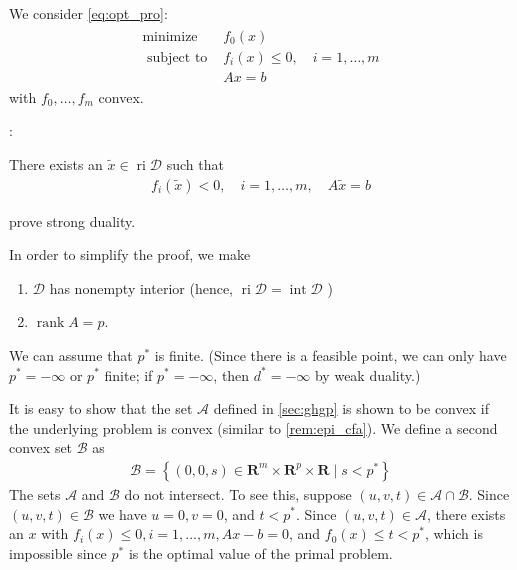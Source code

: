 \documentclass{article}
\newcommand{\ri}{\operatorname{ri}}
\newcommand{\inte}{\operatorname{int}}
\begin{document}

We consider \cref{eq:opt_pro}:
\begin{align}
\begin{array}{ll}
\operatorname{minimize} & f_{0}(x) \\
\text { subject to } & f_{i}(x) \leq 0, \quad i=1, \ldots, m \\
& A x=b
\end{array}%
\end{align}
with $f_{0}, \ldots, f_{m}$ convex.

: 

There exists an $\tilde{x} \in\ri \mathcal{D}$ such that
\begin{align*}
f_{i}(\tilde{x} )<0, \quad i=1, \ldots, m, \quad A \tilde{x} =b
\end{align*}

 prove strong duality.

In order to simplify the proof, we make 
\begin{enumerate}
    \item $\mathcal{D}$ has nonempty interior (hence,  $\ri \mathcal{D}=\inte \mathcal{D}$ )
    \item  $\operatorname{rank} A=p$.
\end{enumerate}


We can assume that $p^* $ is finite. (Since there is a feasible point, we can only have $p^* =-\infty$ or $p^* $ finite; if $p^* =-\infty$, then $d^* =-\infty$ by weak duality.)

It is easy to show that the set $\mathcal{A}$ defined in \cref{sec:ghgp} is shown to be convex if the underlying problem is convex (similar to \cref{rem:epi_cfa}). We define a second convex set $\mathcal{B}$ as
\begin{align*}
\mathcal{B}=\left\{(0,0, s) \in \mathbf{R}^{m} \times \mathbf{R}^{p} \times \mathbf{R} \mid s<p^* \right\}
\end{align*}
The sets $\mathcal{A}$ and $\mathcal{B}$ do not intersect. To see this, suppose $(u, v, t) \in \mathcal{A} \cap \mathcal{B}$. Since $(u, v, t) \in \mathcal{B}$ we have $u=0, v=0$, and $t<p^* $. Since $(u, v, t) \in \mathcal{A}$, there exists an $x$ with $f_{i}(x) \leq 0, i=1, \ldots, m, A x-b=0$, and $f_{0}(x) \leq t<p^* $, which is impossible since $p^* $ is the optimal value of the primal problem.
\end{document}
